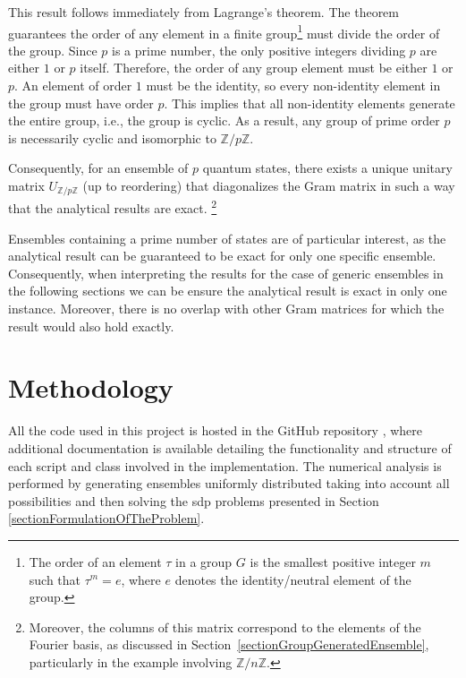 \documentclass[12pt,letterpaper]{article}
\begin{document}
This result follows immediately from Lagrange's theorem. The theorem guarantees the order of any element in a finite group\footnote{The order of an element $\tau$ in a group $G$ is the smallest positive integer $m$ such that $\tau^m = e$, where $e$ denotes the identity/neutral element of the group.} must divide the order of the group. Since $p$ is a prime number, the only positive integers dividing $p$ are either $1$ or $p$ itself. Therefore, the order of any group element must be either $1$ or $p$. An element of order $1$ must be the identity, so every non-identity element in the group must have order $p$. This implies that all non-identity elements generate the entire group, i.e., the group is cyclic. As a result, any group of prime order $p$ is necessarily cyclic and isomorphic to $\mathbb{Z}/p\mathbb{Z}$.

Consequently, for an ensemble of $p$ quantum states, there exists a unique unitary matrix $U_{\mathbb{Z}/p\mathbb{Z}}$ (up to reordering) that diagonalizes the Gram matrix in such a way that the analytical results are exact. \footnote{Moreover, the columns of this matrix correspond to the elements of the Fourier basis, as discussed in Section~\ref{sectionGroupGeneratedEnsemble}, particularly in the example involving $\mathbb{Z}/n\mathbb{Z}$.}

Ensembles containing a prime number of states are of particular interest, as the analytical result can be guaranteed to be exact for only one specific ensemble. Consequently, when interpreting the results for the case of generic ensembles in the following sections we can be ensure the analytical result is exact in only one instance. Moreover, there is no overlap with other Gram matrices for which the result would also hold exactly.

\newpage
\section{Methodology}\label{sectionMethodology}

\hspace{20pt}All the code used in this project is hosted in the GitHub repository \cite{GitHub}, where additional documentation is available detailing the functionality and structure of each script and class involved in the implementation. The numerical analysis is performed by generating ensembles uniformly distributed taking into account all possibilities and then solving the \gls{sdp} problems presented in Section \ref{sectionFormulationOfTheProblem}.
\end{document}
